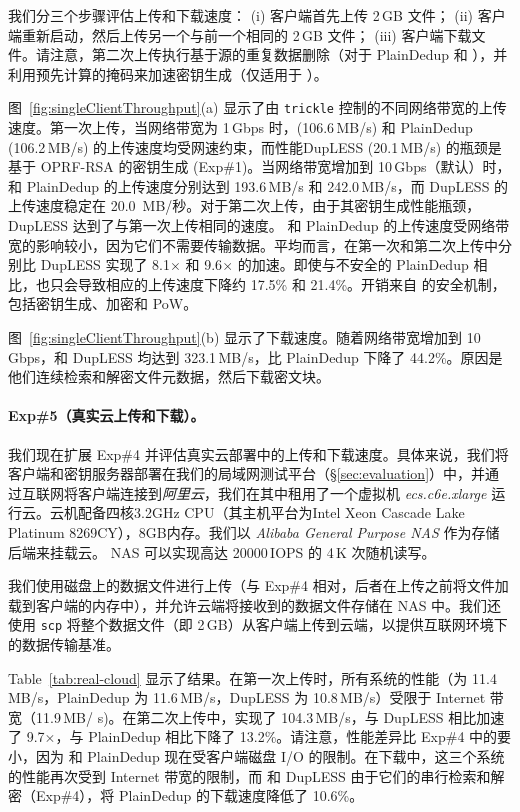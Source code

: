 我们分三个步骤评估上传和下载速度： (i) 客户端首先上传 2\,GB 文件； (ii) 客户端重新启动，然后上传另一个与前一个相同的 2\,GB 文件； (iii) 客户端下载文件。请注意，第二次上传执行基于源的重复数据删除（对于 PlainDedup 和 \sysname），并利用预先计算的掩码来加速密钥生成（仅适用于 \sysname）。

图~\ref{fig:singleClientThroughput}(a) 显示了由 {\tt trickle} \cite{eriksen05} 控制的不同网络带宽的上传速度。第一次上传，当网络带宽为 1\,Gbps 时，\sysname (106.6\,MB/s) 和 PlainDedup (106.2\,MB/s) 的上传速度均受网速约束，而性能DupLESS (20.1\,MB/s) 的瓶颈是基于 OPRF-RSA 的密钥生成 (Exp\#1)。当网络带宽增加到 10\,Gbps（默认）时，\sysname 和 PlainDedup 的上传速度分别达到 193.6\,MB/s 和 242.0\,MB/s，而 DupLESS 的上传速度稳定在 20.0\, MB/秒。对于第二次上传，由于其密钥生成性能瓶颈，DupLESS 达到了与第一次上传相同的速度。 \sysname 和 PlainDedup 的上传速度受网络带宽的影响较小，因为它们不需要传输数据。平均而言，\sysname 在第一次和第二次上传中分别比 DupLESS 实现了 8.1$\times$ 和 9.6$\times$ 的加速。即使与不安全的 PlainDedup 相比，\sysname 也只会导致相应的上传速度下降约 17.5\% 和 21.4\%。开销来自 \sysname 的安全机制，包括密钥生成、加密和 PoW。

图~\ref{fig:singleClientThroughput}(b) 显示了下载速度。随着网络带宽增加到 10\,Gbps，\sysname 和 DupLESS 均达到 323.1\,MB/s，比 PlainDedup 下降了 44.2\%。原因是他们连续检索和解密文件元数据，然后下载密文块。

\paragraph{Exp\#5（真实云上传和下载）。} 我们现在扩展 Exp\#4 并评估真实云部署中的上传和下载速度。具体来说，我们将客户端和密钥服务器部署在我们的局域网测试平台（\S\ref{sec:evaluation}）中，并通过互联网将客户端连接到{\em 阿里云}，我们在其中租用了一个虚拟机{ \em ecs.c6e.xlarge} 运行云。云机配备四核3.2GHz CPU（其主机平台为Intel Xeon Cascade Lake Platinum 8269CY），8GB内存。我们以 {\em Alibaba General Purpose NAS} 作为存储后端来挂载云。 NAS 可以实现高达 20000\,IOPS 的 4\,K 次随机读写。

我们使用磁盘上的数据文件进行上传（与 Exp\#4 相对，后者在上传之前将文件加载到客户端的内存中），并允许云端将接收到的数据文件存储在 NAS 中。我们还使用 {\tt scp} 将整个数据文件（即 2\,GB）从客户端上传到云端，以提供互联网环境下的数据传输基准。


Table~\ref{tab:real-cloud} 显示了结果。在第一次上传时，所有系统的性能（\sysname 为 11.4\,MB/s，PlainDedup 为 11.6\,MB/s，DupLESS 为 10.8\,MB/s）受限于 Internet 带宽（11.9\,MB/ s)。在第二次上传中，\sysname 实现了 104.3\,MB/s，与 DupLESS 相比加速了 9.7$\times$，与 PlainDedup 相比下降了 13.2\%。请注意，性能差异比 Exp\#4 中的要小，因为 \sysname 和 PlainDedup 现在受客户端磁盘 I/O 的限制。在下载中，这三个系统的性能再次受到 Internet 带宽的限制，而 \sysname 和 DupLESS 由于它们的串行检索和解密（Exp\#4），将 PlainDedup 的下载速度降低了 10.6\%。

